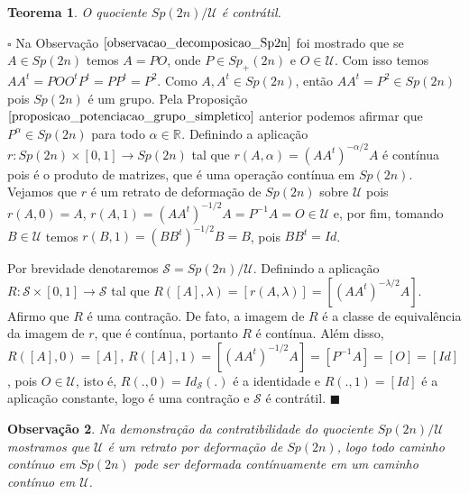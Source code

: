 \documentclass[12pt]{book}
\newtheorem{teorema}{Teorema}[section]
\newtheorem{observacao}[teorema]{Observação}
\newenvironment{prova}[1]{$\square$ #1}{\hfill$\blacksquare$}
\newcommand{\gruposimpletico}[1]{Sp(#1)}
\newcommand{\gruposimpleticopositivo}[1]{Sp_{+}(#1)}
\newcommand{\matrizSimpleticaOrtogonal}{\mathcal{U}}
\newcommand{\real}[1]{\mathbb{R}^{#1}}
\begin{document}
	\begin{teorema}
		O quociente $\gruposimpletico{2n}/\matrizSimpleticaOrtogonal$ é contrátil.
	\end{teorema}
	\begin{prova}
		Na Observação $\ref{observacao_decomposicao_Sp2n}$ foi mostrado que se $A \in \gruposimpletico{2n}$ temos $A=PO$, onde $P \in \gruposimpleticopositivo{2n}$ e $O \in \matrizSimpleticaOrtogonal$. Com isso temos $AA^{t} = POO^{t}P^{t} = PP^{t}=P^{2}$. Como $A,A^{t} \in \gruposimpletico{2n}$, então $AA^{t} =P^{2} \in \gruposimpletico{2n}$ pois $\gruposimpletico{2n}$ é um grupo. Pela Proposição $\ref{proposicao_potenciacao_grupo_simpletico}$ anterior podemos afirmar que $P^{\alpha} \in \gruposimpletico{2n}$ para todo $\alpha \in \real{}$. Definindo a aplicação $r:\gruposimpletico{2n}\times [0,1] \to \gruposimpletico{2n}$ tal que $r(A, \alpha) = (AA^{t})^{-\alpha/2}A$ é contínua pois é o produto de matrizes, que é uma operação contínua em $\gruposimpletico{2n}$. Vejamos que $r$ é um retrato de deformação de $\gruposimpletico{2n}$ sobre $\matrizSimpleticaOrtogonal$ pois $r(A, 0) = A$, $r(A, 1) = (AA^{t})^{-1/2}A = P^{-1}A = O \in \matrizSimpleticaOrtogonal$ e, por fim, tomando $B \in \matrizSimpleticaOrtogonal$ temos $r(B, 1) = (BB^{t})^{-1/2}B = B$, pois $BB^{t} = Id$.
		
		Por brevidade denotaremos $\mathcal{S} = \gruposimpletico{2n}/\matrizSimpleticaOrtogonal$. Definindo a aplicação $R:\mathcal{S} \times [0,1] \to \mathcal{S}$ tal que $R([A], \lambda) = [r(A, \lambda)] = [(AA^{t})^{-\lambda/2}A]$. Afirmo que $R$ é uma contração. De fato, a imagem de $R$ é a classe de equivalência da imagem de $r$, que é contínua, portanto $R$ é contínua. Além disso, $R([A], 0) = [A]$, $R([A], 1) = [(AA^{t})^{-1/2}A] = [P^{-1}A] = [O] = [Id]$, pois $O \in \matrizSimpleticaOrtogonal$, isto é, $R(., 0) = Id_{\mathcal{S}}(.)$ é a identidade e $R(., 1) = [Id]$ é a aplicação constante, logo é uma contração e $\mathcal{S}$ é contrátil.
	\end{prova}
	
	\begin{observacao}\label{observacao_quociente_grupo_simpletico_contratil}
		Na demonstração da contratibilidade do quociente $\gruposimpletico{2n}/\matrizSimpleticaOrtogonal$ mostramos que $\matrizSimpleticaOrtogonal$ é um retrato por deformação de $\gruposimpletico{2n}$, logo todo caminho contínuo em $\gruposimpletico{2n}$ pode ser deformada contínuamente em um caminho contínuo em $\matrizSimpleticaOrtogonal$.
	\end{observacao}
	
\end{document}
